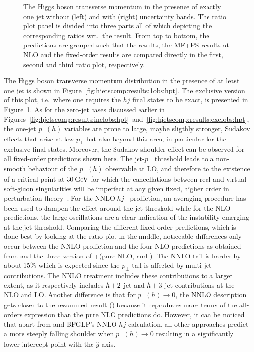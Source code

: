 \begin{figure}[t!]
  \caption{\label{fig:hjetscomp:results:1obs:hpt_excl}%
    The Higgs boson transverse momentum in the presence of exactly one
    jet without (left) and with (right) uncertainty bands. The ratio
    plot panel is divided into three parts all of which depicting the
    corresponding ratios wrt.~the \Powheg \NNLOPS result. From top to
    bottom, the predictions are grouped such that the \NNLOPS results,
    the ME+PS results at NLO and the fixed-order results are compared
    directly in the first, second and third ratio plot, respectively.}
\end{figure}

The Higgs boson transverse momentum distribution in the presence of at
least one jet is shown in
Figure~\ref{fig:hjetscomp:results:1obs:hpt}. The exclusive version of
this plot, i.e.~where one requires the $hj$ final states to be exact,
is presented in Figure~\ref{fig:hjetscomp:results:1obs:hpt_excl}.  As
for the zero-jet cases discussed earlier in
Figures~\ref{fig:hjetscomp:results:inclobs:hpt}~and~\ref{fig:hjetscomp:results:exclobs:hpt},
the one-jet $p_\perp(h)$ variables are prone to large, maybe sligthly
stronger, Sudakov effects that arise at low $p_\perp$ but also beyond
this area, in particular for the exclusive final states. Moreover, the
Sudakov shoulder effect can be observed for all fixed-order
predictions shown here. The jet-$p_\perp$ threshold leads to a
non-smooth behaviour of the $p_\perp(h)$ observable at LO, and
therefore to the existence of a critical point at $30\text{\:GeV}$ for which
the cancellations between real and virtual soft-gluon singularities
will be imperfect at any given fixed, higher order in perturbation
theory~\cite{Catani-Webber}. For the NNLO $hj$~\cite{.} prediction, an
averaging procedure has been used to dampen the effect around the jet
threshold while for the NLO predictions, the large oscillations are a
clear indication of the instability emerging at the jet threshold.
Comparing the different fixed-order predictions, which is done best by
looking at the ratio plot in the middle, noticeable differences only
occur between the NNLO prediction and the four NLO predictions as
obtained from \Powheg and the three version of \GoSam+\Sherpa (pure
NLO, \Minlo and \Loopsim). The NNLO tail is harder by about 15\% which
is expected since the $p_\perp$ tail is affected by multi-jet
contributions. The NNLO treatment includes these contributions to a
larger extent, as it respectively includes $h\!\text{~+~}\!2$-jet and
$h\!\text{~+~}\!3$-jet contributions at the NLO and LO. Another difference is
that for $p_\perp(h)\to0$, the NNLO description gets closer to the
resummed result (\Powheg) because it reproduces more terms of the
all-orders expression than the pure NLO predictions do. However, it
can be noticed that apart from \Powheg and BFGLP's NNLO $hj$
calculation, all other approaches predict a more steeply falling
shoulder when $p_\perp(h)\to0$ resulting in a significantly lower
intercept point with the $\hat y$-axis.

